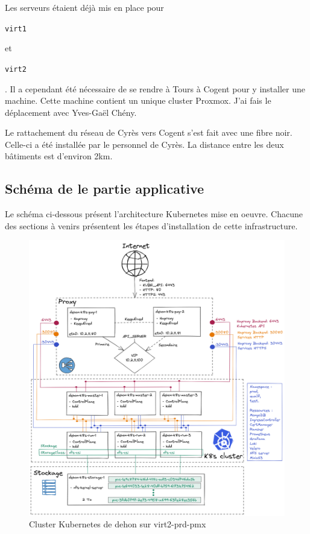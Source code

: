 \documentclass[12pt, a4paper, twoside]{article}
\begin{document}
Les serveurs étaient déjà mis en place pour \begin{code}\texttt{virt1}\end{code} et \begin{code}\texttt{virt2}\end{code}. 
Il a cependant été nécessaire de se rendre à Tours à Cogent pour y installer une machine. 
Cette machine contient un unique \gls{cluster} \gls{Proxmox}. 
J'ai fais le déplacement avec Yves-Gaël Chény.

Le rattachement du réseau de Cyrès vers Cogent s'est fait avec une fibre noir.
Celle-ci a été installée par le personnel de Cyrès.
La distance entre les deux bâtiments est d'environ 2km.

\newpage
\subsection{Schéma de le partie applicative}
Le schéma ci-dessous présent l'architecture Kubernetes mise en oeuvre.
Chacune des sections à venirs présentent les étapes d'installation de cette infrastructure.

\begin{figure}[!ht]
    \centering
        \includegraphics[width=\textwidth]{src/graph_dehon2.png}
    \caption{Cluster \gls{Kubernetes} de dehon sur virt2-prd-pmx}
    \label{fig:graph_dehon2}
\end{figure}
\end{document}
